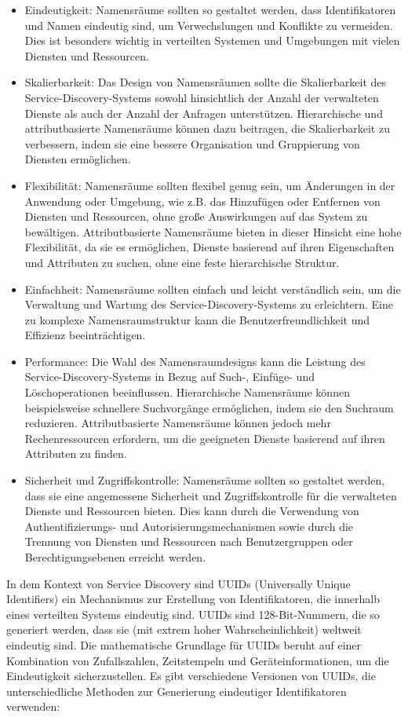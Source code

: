 \documentclass[../vs-script-first-v01.tex]{subfiles}
\begin{document}
\begin{itemize}
\item Eindeutigkeit: Namensräume sollten so gestaltet werden, dass Identifikatoren und Namen eindeutig sind, um Verwechslungen und Konflikte zu vermeiden. Dies ist besonders wichtig in verteilten Systemen und Umgebungen mit vielen Diensten und Ressourcen.
\item Skalierbarkeit: Das Design von Namensräumen sollte die Skalierbarkeit des Service-Discovery-Systems sowohl hinsichtlich der Anzahl der verwalteten Dienste als auch der Anzahl der Anfragen unterstützen. Hierarchische und attributbasierte Namensräume können dazu beitragen, die Skalierbarkeit zu verbessern, indem sie eine bessere Organisation und Gruppierung von Diensten ermöglichen.
\item Flexibilität: Namensräume sollten flexibel genug sein, um Änderungen in der Anwendung oder Umgebung, wie z.B. das Hinzufügen oder Entfernen von Diensten und Ressourcen, ohne große Auswirkungen auf das System zu bewältigen. Attributbasierte Namensräume bieten in dieser Hinsicht eine hohe Flexibilität, da sie es ermöglichen, Dienste basierend auf ihren Eigenschaften und Attributen zu suchen, ohne eine feste hierarchische Struktur.
\item Einfachheit: Namensräume sollten einfach und leicht verständlich sein, um die Verwaltung und Wartung des Service-Discovery-Systems zu erleichtern. Eine zu komplexe Namensraumstruktur kann die Benutzerfreundlichkeit und Effizienz beeinträchtigen.
\item Performance: Die Wahl des Namensraumdesigns kann die Leistung des Service-Discovery-Systems in Bezug auf Such-, Einfüge- und Löschoperationen beeinflussen. Hierarchische Namensräume können beispielsweise schnellere Suchvorgänge ermöglichen, indem sie den Suchraum reduzieren. Attributbasierte Namensräume können jedoch mehr Rechenressourcen erfordern, um die geeigneten Dienste basierend auf ihren Attributen zu finden.
\item Sicherheit und Zugriffskontrolle: Namensräume sollten so gestaltet werden, dass sie eine angemessene Sicherheit und Zugriffskontrolle für die verwalteten Dienste und Ressourcen bieten. Dies kann durch die Verwendung von Authentifizierungs- und Autorisierungsmechanismen sowie durch die Trennung von Diensten und Ressourcen nach Benutzergruppen oder Berechtigungsebenen erreicht werden.
\end{itemize}
In dem Kontext von Service Discovery sind UUIDs (Universally Unique Identifiers) ein Mechanismus zur Erstellung von Identifikatoren, die innerhalb eines verteilten Systems eindeutig sind. UUIDs sind 128-Bit-Nummern, die so generiert werden, dass sie (mit extrem hoher Wahrscheinlichkeit) weltweit eindeutig sind. Die mathematische Grundlage für UUIDs beruht auf einer Kombination von Zufallszahlen, Zeitstempeln und Geräteinformationen, um die Eindeutigkeit sicherzustellen.
Es gibt verschiedene Versionen von UUIDs, die unterschiedliche Methoden zur Generierung eindeutiger Identifikatoren verwenden:
\end{document}
